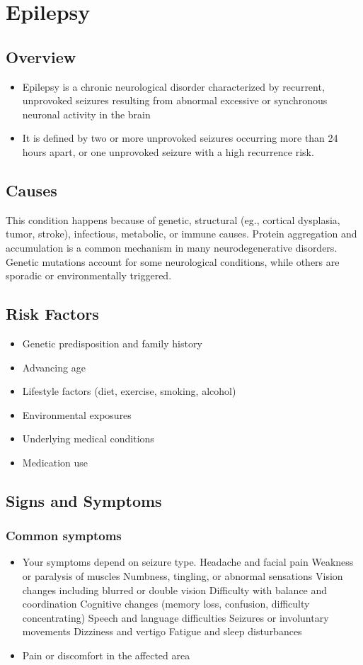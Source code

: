 \chapter{Epilepsy}
\label{sec:Epilepsy}

\section{Overview}


\begin{itemize}[noitemsep]
  \item Epilepsy is a chronic neurological disorder characterized by recurrent, unprovoked seizures resulting from abnormal excessive or synchronous neuronal activity in the brain
  \item It is defined by two or more unprovoked seizures occurring more than 24 hours apart, or one unprovoked seizure with a high recurrence risk.
\end{itemize}
\section{Causes}
This condition happens because of genetic, structural (eg., cortical dysplasia, tumor, stroke), infectious, metabolic, or immune causes.    Protein aggregation and accumulation is a common mechanism in many neurodegenerative disorders.  Genetic mutations account for some neurological conditions, while others are sporadic or environmentally triggered.   
\section{Risk Factors}
\begin{itemize}[noitemsep]
  \item Genetic predisposition and family history
  \item Advancing age
  \item Lifestyle factors (diet, exercise, smoking, alcohol)
  \item Environmental exposures
  \item Underlying medical conditions
  \item Medication use
\end{itemize}
\section{Signs and Symptoms}
\subsection{Common symptoms}
\begin{itemize}[noitemsep]
  \item Your symptoms depend on seizure type. Headache and facial pain Weakness or paralysis of muscles Numbness, tingling, or abnormal sensations Vision changes including blurred or double vision Difficulty with balance and coordination Cognitive changes (memory loss, confusion, difficulty concentrating) Speech and language difficulties Seizures or involuntary movements Dizziness and vertigo Fatigue and sleep disturbances
  \item Pain or discomfort in the affected area
  \end{itemize}
